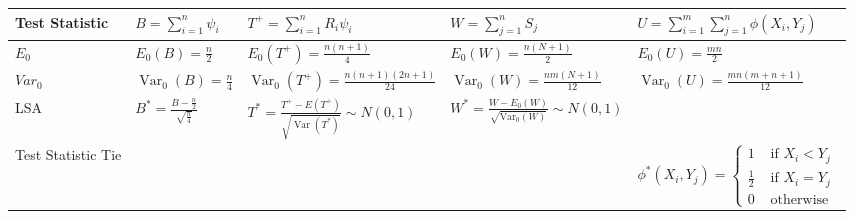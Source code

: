 \documentclass[10pt,a4paper]{article}
\begin{document}
\begin{table}[]
\begin{tabular}{|l|l|l|l|l|}
            Test Statistic     & $B=\sum_{i=1}^{n} \psi_{i}$                      & $T^{+}=\sum_{i=1}^{n} R_{i} \psi_{i}$                                                                                                         & $W=\sum_{j=1}^{n} S_{j}$                                                                                                           & $U=\sum_{i=1}^{m} \sum_{j=1}^{n} \phi\left(X_{i}, Y_{j}\right)$                                                                                                                             \\ \hline
            $E_0$              & $E_{0}(B)=\frac{n}{2}$                           & $E_{0}\left(T^{+}\right)=\frac{n(n+1)}{4}$                                                                                                    & $E_{0}(W)=\frac{n(N+1)}{2}$                                                                                                        & $E_{0}(U)=\frac{m n}{2}$                                                                                                                                                                    \\ \hline
            $Var_0$            & $\operatorname{Var}_{0}(B)=\frac{n}{4}$          & $\operatorname{Var}_{0}\left(T^{+}\right)=\frac{n(n+1)(2 n+1)}{24}$                                                                           & $\operatorname{Var}_{0}(W)=\frac{n m(N+1)}{12}$                                                                                    & $\operatorname{Var}_{0}(U)=\frac{m n(m+n+1)}{12}$                                                                                                                                           \\ \hline
            LSA                & $B^{*}=\frac{B-\frac{n}{2}}{\sqrt{\frac{n}{4}}}$ & $T^{*}=\frac{T^{+}-E\left(T^{+}\right)}{\sqrt{\operatorname{Var}\left(T^{*}\right)}} \sim N(0,1)$                                             & $W^{*}=\frac{W-E_{0}(W)}{\sqrt{\operatorname{Var_0}(W)}} \sim N(0,1)$                                                              &                                                                                                                                                                                             \\ \hline
            Test Statistic Tie &                                                  &                                                                                                                                               &                                                                                                                                    & $\phi^{*}\left(X_{i}, Y_{j}\right)=\left\{\begin{array}{ll}{1} & {\text { if } X_{i}<Y_{j}} \\ {\frac{1}{2}} & {\text { if } X_{i}=Y_{j}} \\ {0} & {\text { otherwise }}\end{array}\right.$ \\ \hline

\end{tabular}
\end{table}
\end{document}
